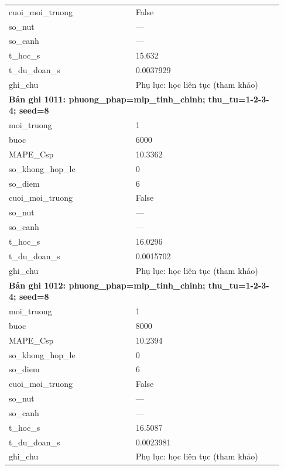 \begin{longtable}{p{0.43\linewidth}p{0.50\linewidth}}
cuoi\_\allowbreak moi\_\allowbreak truong & False \\
so\_\allowbreak nut & — \\
so\_\allowbreak canh & — \\
t\_\allowbreak hoc\_\allowbreak s & 15.632 \\
t\_\allowbreak du\_\allowbreak doan\_\allowbreak s & 0.0037929 \\
ghi\_\allowbreak chu & Phụ lục: học liên tục (tham khảo) \\
\midrule
\multicolumn{2}{p{0.95\linewidth}}{\textbf{Bản ghi 1011: phuong\_phap=mlp\_tinh\_chinh; thu\_tu=1-2-3-4; seed=8}} \\
moi\_\allowbreak truong & 1 \\
buoc & 6000 \\
MAPE\_\allowbreak Csp & 10.3362 \\
so\_\allowbreak khong\_\allowbreak hop\_\allowbreak le & 0 \\
so\_\allowbreak diem & 6 \\
cuoi\_\allowbreak moi\_\allowbreak truong & False \\
so\_\allowbreak nut & — \\
so\_\allowbreak canh & — \\
t\_\allowbreak hoc\_\allowbreak s & 16.0296 \\
t\_\allowbreak du\_\allowbreak doan\_\allowbreak s & 0.0015702 \\
ghi\_\allowbreak chu & Phụ lục: học liên tục (tham khảo) \\
\midrule
\multicolumn{2}{p{0.95\linewidth}}{\textbf{Bản ghi 1012: phuong\_phap=mlp\_tinh\_chinh; thu\_tu=1-2-3-4; seed=8}} \\
moi\_\allowbreak truong & 1 \\
buoc & 8000 \\
MAPE\_\allowbreak Csp & 10.2394 \\
so\_\allowbreak khong\_\allowbreak hop\_\allowbreak le & 0 \\
so\_\allowbreak diem & 6 \\
cuoi\_\allowbreak moi\_\allowbreak truong & False \\
so\_\allowbreak nut & — \\
so\_\allowbreak canh & — \\
t\_\allowbreak hoc\_\allowbreak s & 16.5087 \\
t\_\allowbreak du\_\allowbreak doan\_\allowbreak s & 0.0023981 \\
ghi\_\allowbreak chu & Phụ lục: học liên tục (tham khảo) \\

\end{longtable}
